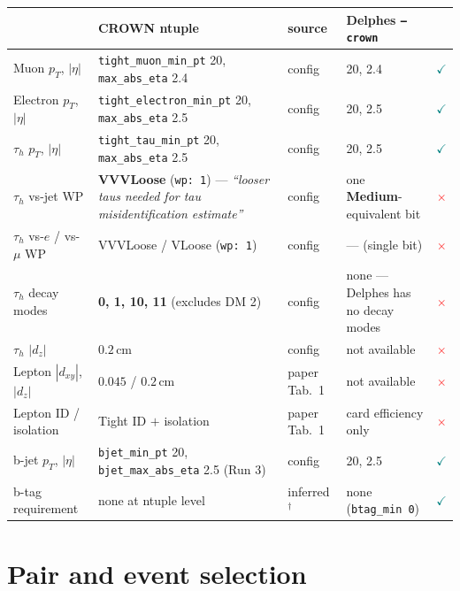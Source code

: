\documentclass[11pt,a4paper]{article}
\newcommand{\tauh}{\tau_{h}}
\newcommand{\pt}{p_{T}}
\newcommand{\ok}{\textcolor{teal}{$\checkmark$}}
\newcommand{\no}{\textcolor{red}{$\times$}}
\begin{document}
\begin{table}[htbp]
\centering\small
\begin{tabular}{@{}lp{5.0cm}lp{3.9cm}c@{}}
\toprule
& \textbf{CROWN ntuple} & \textbf{source} & \textbf{Delphes \texttt{--crown}} & \\
\midrule
Muon $\pt$, $|\eta|$ & \texttt{tight\_muon\_min\_pt} 20, \texttt{max\_abs\_eta} 2.4
  & config & 20, 2.4 & \ok \\
Electron $\pt$, $|\eta|$ & \texttt{tight\_electron\_min\_pt} 20,
  \texttt{max\_abs\_eta} 2.5 & config & 20, 2.5 & \ok \\
$\tauh$ $\pt$, $|\eta|$ & \texttt{tight\_tau\_min\_pt} 20, \texttt{max\_abs\_eta} 2.5
  & config & 20, 2.5 & \ok \\
$\tauh$ vs-jet WP & \textbf{VVVLoose} (\texttt{wp: 1}) --- \emph{``looser taus needed
  for tau misidentification estimate''} & config
  & one \textbf{Medium}-equivalent bit & \no \\
$\tauh$ vs-$e$ / vs-$\mu$ WP & VVVLoose / VLoose (\texttt{wp: 1}) & config
  & --- (single bit) & \no \\
$\tauh$ decay modes & \textbf{0, 1, 10, 11} (excludes DM 2) & config
  & none --- Delphes has no decay modes & \no \\
$\tauh$ $|d_z|$ & $0.2\,\si{\cm}$ & config & not available & \no \\
Lepton $|d_{xy}|$, $|d_z|$ & $0.045$ / $0.2\,\si{\cm}$ & paper Tab.~1
  & not available & \no \\
Lepton ID / isolation & Tight ID $+$ isolation & paper Tab.~1
  & card efficiency only & \no \\
b-jet $\pt$, $|\eta|$ & \texttt{bjet\_min\_pt} 20, \texttt{bjet\_max\_abs\_eta} 2.5
  (Run 3) & config & 20, 2.5 & \ok \\
b-tag requirement & none at ntuple level & inferred$^{\dagger}$
  & none (\texttt{btag\_min 0}) & \ok \\
\bottomrule
\end{tabular}
\end{table}


\section{Pair and event selection}
\end{document}
